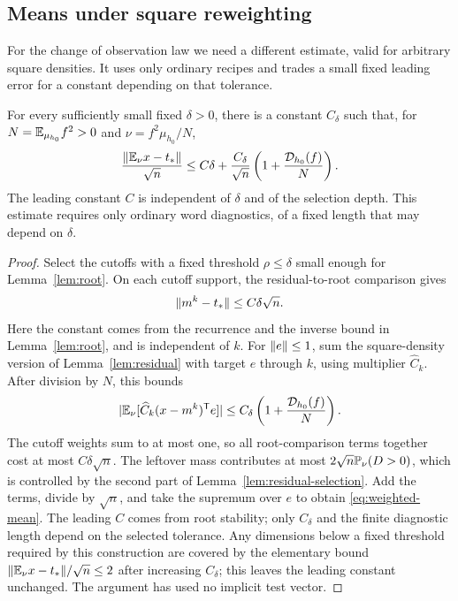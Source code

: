 \subsection{Means under square reweighting}
For the change of observation law we need a different estimate, valid for
arbitrary square densities. It uses only ordinary recipes and trades a
small fixed leading error for a constant depending on that tolerance.
\begin{proposition}\label{prop:weighted-mean}
For every sufficiently small fixed $\delta>0$, there is a constant $C_\delta$
such that, for $N=\mathbb E_{\mu_{h_0}}f^2>0$ and $\nu=f^2\mu_{h_0}/N$,
\begin{equation}\label{eq:weighted-mean}
 \frac{\lVert \mathbb E_\nu x-t_*\rVert}{\sqrt n}
 \le C\delta+\frac{C_\delta}{\sqrt n}
               \left(1+\frac{\mathcal D_{h_0}(f)}{N}\right).
\end{equation}
The leading constant $C$ is independent of $\delta$ and of the selection
depth. This estimate requires only ordinary word diagnostics, of a fixed
length that may depend on $\delta$.
\end{proposition}

\begin{proof}
Select the cutoffs with a fixed threshold $\rho\le\delta$ small enough
for Lemma~\ref{lem:root}. On each cutoff support, the residual-to-root
comparison gives
\[
 \lVert m^k-t_*\rVert\le C\delta\sqrt n.
\]
Here the constant comes from the recurrence and the inverse bound in
Lemma~\ref{lem:root}, and is independent of $k$.
For $\lVert e\rVert\le1$, sum the square-density version of
Lemma~\ref{lem:residual} with target $e$ through $k$, using multiplier
$\widehat C_k$. After division by $N$, this bounds
\[
 \lvert \mathbb E_\nu[\widehat C_k(x-m^k)^{\mathsf T}e]\rvert
 \le C_\delta\left(1+\frac{\mathcal D_{h_0}(f)}{N}\right).
\]
The cutoff weights sum to at most one, so all root-comparison terms
together cost at most $C\delta\sqrt n$. The leftover mass contributes
at most $2\sqrt n\mathbb P_\nu(D>0)$, which is controlled by the second
part of Lemma~\ref{lem:residual-selection}. Add the terms, divide by
$\sqrt n$, and take the supremum over $e$ to obtain
\eqref{eq:weighted-mean}. The leading $C$ comes from root stability;
only $C_\delta$ and the finite diagnostic length depend on the selected
tolerance. Any dimensions below a fixed threshold required by this
construction are covered by the elementary bound
$\lVert \mathbb E_\nu x-t_*\rVert/\sqrt n\le2$ after increasing $C_\delta$; this
leaves the leading constant unchanged. The argument has used no implicit
test vector.
\end{proof}
